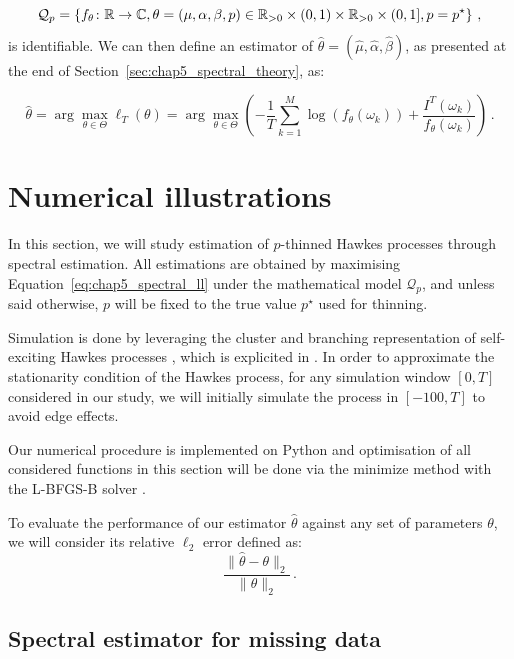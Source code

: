     \[\mathcal{Q}_{p} = 
        \left\{
            f_\theta \colon {\mathbb R} \to {\mathbb C}, 
            \theta = (\mu, \alpha, \beta, p) \in {\mathbb R}_{>0}\times (0,1) \times {\mathbb R}_{>0}\times(0,1], p=p^\star
        \right\}\,,
    \]
    is identifiable.
    We can then define an estimator of $\hat \theta = (\hat \mu, \hat \alpha, \hat \beta)$, as presented at the end of Section~\ref{sec:chap5_spectral_theory}, as:

    \[
        \hat \theta = \arg\max_{\theta \in \Theta} \ell_T (\theta)
        = \arg\max_{\theta \in \Theta}  \left(-\frac{1}{T}\sum_{k=1}^{M}{\log(f_\theta (\omega_k)) + \frac{I^T(\omega_k)}{f_\theta(\omega_k)}}\right)\,.
    \]

\section{Numerical illustrations}
    In this section, we will study estimation of $p$-thinned Hawkes processes through spectral estimation.
    All estimations are obtained by maximising Equation~\eqref{eq:chap5_spectral_ll} under the mathematical model $\mathcal{Q}_p$,
    and unless said otherwise, $p$ will be fixed to the true value $p^\star$ used for thinning.

    Simulation is done by leveraging the cluster and branching representation of self-exciting Hawkes processes \parencite{Hawkes1974},
    which is explicited in \textcite[Algorithm 2]{Moller2005}.
    In order to approximate the stationarity condition of the Hawkes process,
    for any simulation window $[0,T]$ considered in our study, 
    we will initially simulate the process in $[-100, T]$ to avoid edge effects.

    Our numerical procedure is implemented on \textrm{Python} and optimisation of all considered functions in this section will be done via the \textrm{minimize} method with the L-BFGS-B solver \parencite{Byrd1995}.

    To evaluate the performance of our estimator $\hat\theta$ against any set of parameters $\theta$,
    we will consider its relative $\ell_2$ error defined as:
    \[\frac{\|\hat \theta - \theta\|_2}{\|\theta\|_2}\,.\]

    \subsection{Spectral estimator for missing data}\label{sec:chap5_missing_numerical}

